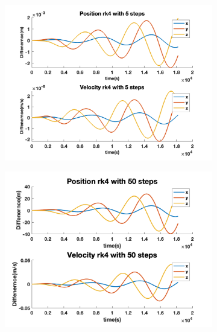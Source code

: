 \documentclass[12pt
,headinclude
,headsepline
,bibtotocnumbered
]{scrartcl}
\begin{document}
\begin{figure}[H]
\begin{subfigure}[b]{0.45\textwidth}
    \includegraphics[width=1\textwidth]{./plots/rk4_5_yprime.png}
    \end{subfigure}
    \begin{subfigure}[b]{0.45\textwidth}
    \includegraphics[width=1\textwidth]{./plots/rk4_50_yprime.png}
    \end{subfigure}
\end{figure}
\end{document}
